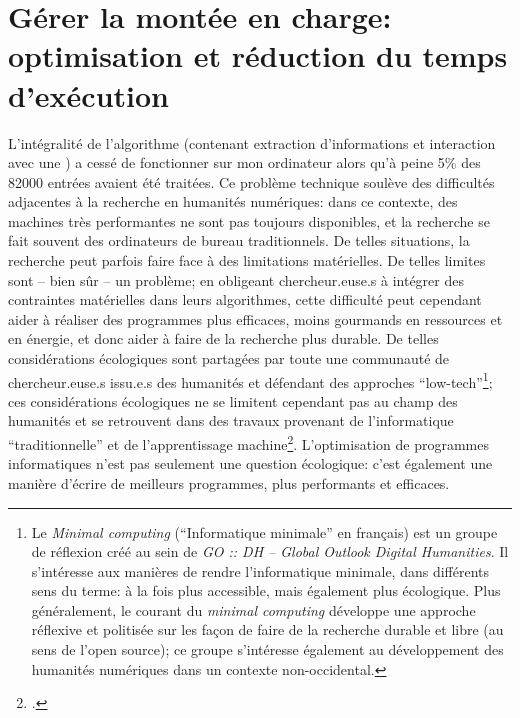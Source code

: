 \section{Gérer la montée en charge: optimisation et réduction du temps d'exécution}
L'intégralité de l'algorithme (contenant extraction d'informations et interaction avec une \api{}) a cessé de fonctionner sur mon ordinateur alors qu'à peine 5\% des 82000 entrées avaient été traitées. Ce problème technique soulève des difficultés adjacentes à la recherche en humanités numériques: dans ce contexte, des machines très performantes ne sont pas toujours disponibles, et la recherche se fait souvent des ordinateurs de bureau traditionnels. De telles situations, la recherche peut parfois faire face à des limitations matérielles. De telles limites sont -- bien sûr -- un problème; en obligeant chercheur.euse.s à intégrer des contraintes matérielles dans leurs algorithmes, cette difficulté peut cependant aider à réaliser des programmes plus efficaces, moins gourmands en ressources et en énergie, et donc aider à faire de la recherche plus durable. De telles considérations écologiques sont partagées par toute une communauté de chercheur.euse.s issu.e.s des humanités et défendant des approches \enquote{low-tech}\footnote{
	Le \textit{Minimal computing} (\enquote{Informatique minimale} en français) est un groupe de réflexion créé au sein de \textit{GO :: DH -- Global Outlook Digital Humanities}. Il s'intéresse aux manières de rendre l'informatique minimale, dans différents sens du terme: à la fois plus accessible, mais également plus écologique. Plus généralement, le courant du \textit{minimal computing} développe une approche réflexive et politisée sur les façon de faire de la recherche durable et libre (au sens de l'\gls{open source}); ce groupe s'intéresse également au développement des humanités numériques dans un contexte non-occidental\cite{sayers_minimal_2016}.
}; ces considérations écologiques ne se limitent cependant pas au champ des humanités et se retrouvent dans des travaux provenant de l'informatique \enquote{traditionnelle} et de l'apprentissage machine\footcite{strubell_energy_2019}. L'optimisation de programmes informatiques n'est pas seulement une question écologique: c'est également une manière d'écrire de meilleurs programmes, plus performants et efficaces.

